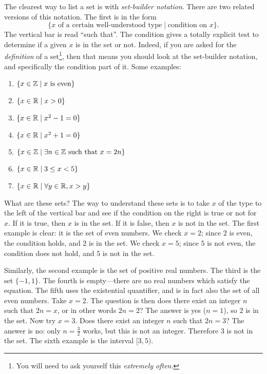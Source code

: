 \documentclass{tufte-book}
\begin{document}
The clearest way to list a set is with \emph{set-builder notation}. There are two related versions of this notation. The first is in the form
\[
\{ x \text{ of a certain well-understood type} \mid \text{condition on } x\}.
\]
The vertical bar is read ``such that''. The condition gives a totally explicit test to determine if a given $x$ is in the set or not. Indeed, if you are asked for the \emph{definition} of a set\footnote{You will need to ask yourself this \emph{extremely often}.}, then that means you should look at the set-builder notation, and specifically the condition part of it. Some examples:
\begin{enumerate}
    \item $\{x \in \mathbb{Z} \mid x \text{ is even}\}$
    \item $\{x \in \mathbb{R} \mid x > 0 \}$
    \item $\{x \in \mathbb{R} \mid x^2 - 1 = 0\}$
    \item $\{x \in \mathbb{R} \mid x^2 + 1 = 0\}$
    \item $\{x \in \mathbb{Z} \mid \exists n \in \mathbb{Z} \text{ such that } x = 2n\}$ 
    \item $\{x \in \mathbb{R} \mid 3 \leq x < 5\}$
    \item $\{x \in \mathbb{R} \mid \forall y \in \mathbb{R}, x > y\}$
\end{enumerate}
What are these sets? The way to understand these sets is to take $x$ of the type to the left of the vertical bar and see if the condition on the right is true or not for $x$. If it is true, then $x$ is in the set. If it is false, then $x$ is not in the set. The first example is clear: it is the set of even numbers. We check $x = 2$; since $2$ is even, the condition holds, and $2$ is in the set. We check $x = 5$; since $5$ is not even, the condition does not hold, and $5$ is not in the set.

Similarly, the second example is the set of positive real numbers. The third is the set $\{-1, 1\}$. The fourth is empty---there are no real numbers which satisfy the equation. The fifth uses the existential quantifier, and is in fact also the set of all even numbers. Take $x = 2$. The question is then does there exist an integer $n$ such that $2n = x$, or in other words $2n = 2$? The answer is yes ($n = 1$), so $2$ is in the set. Now try $x = 3$. Does there exist an integer $n$ such that $2n = 3$? The answer is no: only $n = \frac32$ works, but this is not an integer. Therefore $3$ is not in the set. The sixth example is the interval $[3,5)$.
\end{document}
